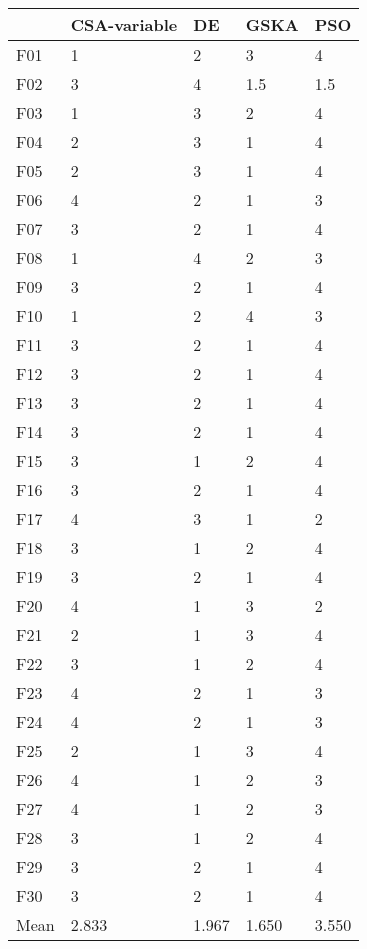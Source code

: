 \begin{tabular}{lllll}
\toprule
{} & CSA-variable &     DE &   GSKA &    PSO \\
\midrule
F01  &            1 &      2 &      3 &      4 \\
F02  &            3 &      4 &    1.5 &    1.5 \\
F03  &            1 &      3 &      2 &      4 \\
F04  &            2 &      3 &      1 &      4 \\
F05  &            2 &      3 &      1 &      4 \\
F06  &            4 &      2 &      1 &      3 \\
F07  &            3 &      2 &      1 &      4 \\
F08  &            1 &      4 &      2 &      3 \\
F09  &            3 &      2 &      1 &      4 \\
F10  &            1 &      2 &      4 &      3 \\
F11  &            3 &      2 &      1 &      4 \\
F12  &            3 &      2 &      1 &      4 \\
F13  &            3 &      2 &      1 &      4 \\
F14  &            3 &      2 &      1 &      4 \\
F15  &            3 &      1 &      2 &      4 \\
F16  &            3 &      2 &      1 &      4 \\
F17  &            4 &      3 &      1 &      2 \\
F18  &            3 &      1 &      2 &      4 \\
F19  &            3 &      2 &      1 &      4 \\
F20  &            4 &      1 &      3 &      2 \\
F21  &            2 &      1 &      3 &      4 \\
F22  &            3 &      1 &      2 &      4 \\
F23  &            4 &      2 &      1 &      3 \\
F24  &            4 &      2 &      1 &      3 \\
F25  &            2 &      1 &      3 &      4 \\
F26  &            4 &      1 &      2 &      3 \\
F27  &            4 &      1 &      2 &      3 \\
F28  &            3 &      1 &      2 &      4 \\
F29  &            3 &      2 &      1 &      4 \\
F30  &            3 &      2 &      1 &      4 \\
Mean &        2.833 &  1.967 &  1.650 &  3.550 \\
\bottomrule
\end{tabular}
